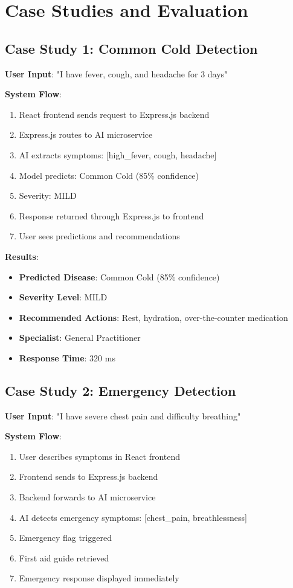 \documentclass[12pt,a4paper]{article}
\begin{document}
\section{Case Studies and Evaluation}

\subsection{Case Study 1: Common Cold Detection}
\textbf{User Input}: "I have fever, cough, and headache for 3 days"

\textbf{System Flow}:
\begin{enumerate}
    \item React frontend sends request to Express.js backend
    \item Express.js routes to AI microservice
    \item AI extracts symptoms: [high\_fever, cough, headache]
    \item Model predicts: Common Cold (85\% confidence)
    \item Severity: MILD
    \item Response returned through Express.js to frontend
    \item User sees predictions and recommendations
\end{enumerate}

\textbf{Results}:
\begin{itemize}
    \item \textbf{Predicted Disease}: Common Cold (85\% confidence)
    \item \textbf{Severity Level}: MILD
    \item \textbf{Recommended Actions}: Rest, hydration, over-the-counter medication
    \item \textbf{Specialist}: General Practitioner
    \item \textbf{Response Time}: 320 ms
\end{itemize}

\subsection{Case Study 2: Emergency Detection}
\textbf{User Input}: "I have severe chest pain and difficulty breathing"

\textbf{System Flow}:
\begin{enumerate}
    \item User describes symptoms in React frontend
    \item Frontend sends to Express.js backend
    \item Backend forwards to AI microservice
    \item AI detects emergency symptoms: [chest\_pain, breathlessness]
    \item Emergency flag triggered
    \item First aid guide retrieved
    \item Emergency response displayed immediately
\end{enumerate}
\end{document}
